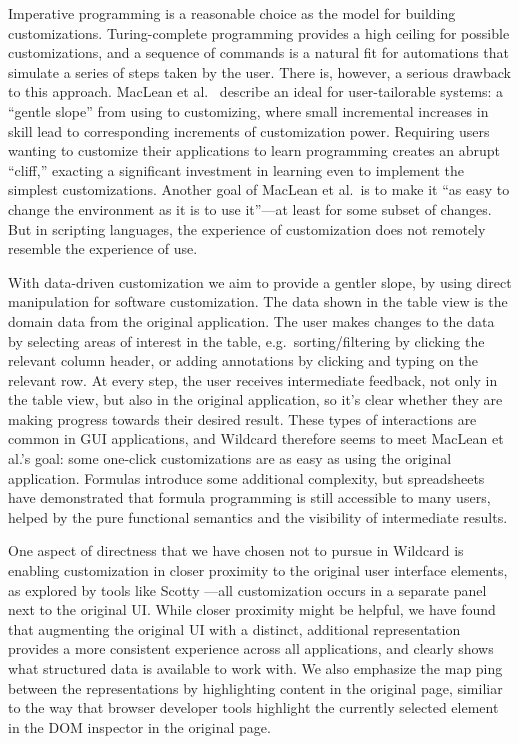 \documentclass[sigplan,screen,10pt,anonymous,review]{acmart}
\begin{document}
Imperative programming is a reasonable choice as the model for building
customizations. Turing-complete programming provides a high ceiling for
possible customizations, and a sequence of commands is a natural fit for
automations that simulate a series of steps taken by the user. There is,
however, a serious drawback to this approach. MacLean et
al.~\citep{maclean1990} describe an ideal for user-tailorable systems: a
``gentle slope'' from using to customizing, where small incremental
increases in skill lead to corresponding increments of customization
power. Requiring users wanting to customize their applications to learn
programming creates an abrupt ``cliff,'' exacting a significant
investment in learning even to implement the simplest customizations.
Another goal of MacLean et al.~is to make it ``as easy to change the
environment as it is to use it''---at least for some subset of changes.
But in scripting languages, the experience of customization does not
remotely resemble the experience of use.

With data-driven customization we aim to provide a gentler slope, by
using direct manipulation for software customization. The data shown in
the table view is the domain data from the original application. The
user makes changes to the data by selecting areas of interest in the
table, e.g.~sorting/filtering by clicking the relevant column header, or
adding annotations by clicking and typing on the relevant row. At every
step, the user receives intermediate feedback, not only in the table
view, but also in the original application, so it's clear whether they
are making progress towards their desired result. These types of
interactions are common in GUI applications, and Wildcard therefore
seems to meet MacLean et al.'s goal: some one-click customizations are
as easy as using the original application. Formulas introduce some
additional complexity, but spreadsheets have demonstrated that formula
programming is still accessible to many users, helped by the pure
functional semantics and the visibility of intermediate results.

One aspect of directness that we have chosen not to pursue in Wildcard
is enabling customization in closer proximity to the original user
interface elements, as explored by tools like Scotty
\citep{eagan2011}---all customization occurs in a separate panel next to
the original UI. While closer proximity might be helpful, we have found
that augmenting the original UI with a distinct, additional
representation provides a more consistent experience across all
applications, and clearly shows what structured data is available to
work with. We also emphasize the map ping between the representations by
highlighting content in the original page, similiar to the way that
browser developer tools highlight the currently selected element in the
DOM inspector in the original page.
\end{document}

